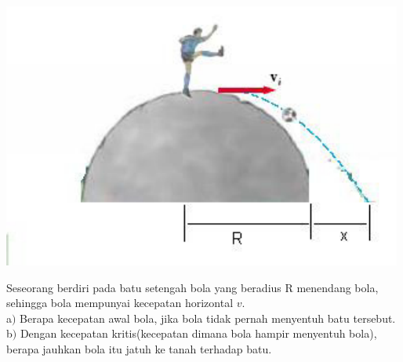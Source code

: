 \begin{center}
\includegraphics [width=\columnwidth]{latex/eps/1_4_2_image_1-eps-converted-to.pdf}
\end{center}
Seseorang berdiri pada batu setengah bola yang beradius R menendang bola, sehingga bola mempunyai kecepatan horizontal $v$. \\ a$)$ Berapa kecepatan awal bola, jika bola tidak pernah menyentuh batu tersebut. \\
b$)$ Dengan kecepatan kritis(kecepatan dimana bola hampir menyentuh bola), berapa jauhkan bola itu jatuh ke tanah terhadap batu.
